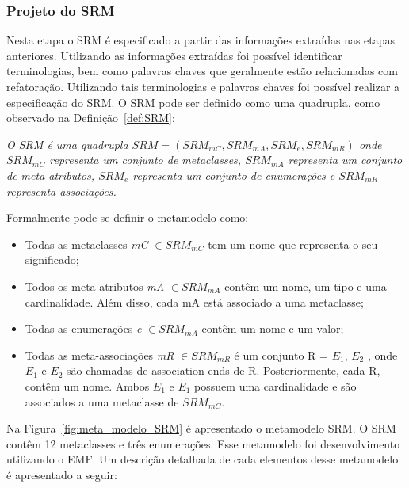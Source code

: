 \subsubsection{Projeto do SRM}

Nesta etapa o SRM é especificado a partir das informações extraídas nas etapas anteriores. Utilizando as informações extraídas foi possível identificar terminologias, bem como palavras chaves que geralmente estão relacionadas com refatoração. Utilizando tais terminologias e palavras chaves foi possível realizar a especificação do SRM. O SRM pode ser definido como uma quadrupla, como observado na Definição~\ref{def:SRM}: 


\begin{definicao}\label{def:SRM}
    \textit{O SRM é uma quadrupla $SRM = (SRM_{mC}, SRM_{mA}, SRM_{e}, SRM_{mR})$ onde $SRM_{mC} $ representa um conjunto de metaclasses, $SRM_{mA}$ representa um conjunto de meta-atributos, $SRM_{e}$ representa um conjunto de enumerações e $SRM_{mR}$ representa associações.}
\end{definicao}

Formalmente pode-se definir o metamodelo como:

\begin{itemize}
	\item Todas as metaclasses \textit{mC} $\in SRM_{mC}$ tem um nome que representa o seu significado;
	\item Todos os meta-atributos \textit{mA} $\in SRM_{mA}$ contêm um nome, um tipo e uma cardinalidade. Além disso, cada mA está associado a uma metaclasse;
	\item Todas as enumerações \textit{e} $\in SRM_{mA}$ contêm um nome e um valor;
	\item Todas as meta-associações \textit{mR} $\in SRM_{mR}$ é um conjunto R = $E_{1}$, $E_{2}$  , onde  $E_{1}$ e $E_{2}$ são chamadas de association ends de R. Posteriormente, cada R, contêm um nome. Ambos $E_{1}$  e $E_{1}$ possuem uma cardinalidade e são associados a uma metaclasse de $SRM_{mC}$.
\end{itemize}

Na Figura~\ref{fig:meta_modelo_SRM} é apresentado o metamodelo SRM. O SRM contêm 12 metaclasses e três enumerações. Esse metamodelo foi desenvolvimento utilizando o EMF. Um descrição detalhada de cada elementos desse metamodelo é apresentado a  seguir:

